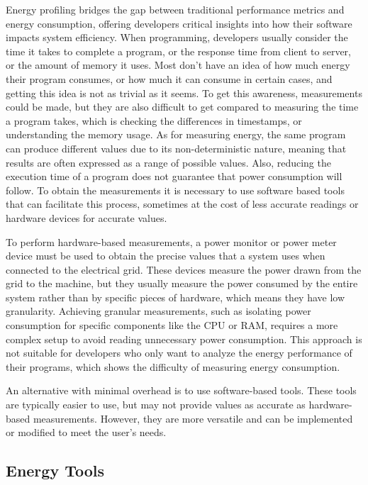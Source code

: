 \documentclass[sigplan]{acmart}
\begin{document}
Energy profiling bridges the gap between traditional performance metrics and energy consumption, offering developers critical insights into how their software impacts system efficiency.
When programming, developers usually consider the time it takes to complete a program, or the response time from client to server, or the amount of memory it uses. Most don't have an idea of how much energy their program consumes, or how much it can consume in certain cases, and getting this idea is not as trivial as it seems. To get this awareness, measurements could be made, but they are also difficult to get compared to measuring the time a program takes, which is checking the differences in timestamps, or understanding the memory usage. As for measuring energy, the same program can produce different values due to its non-deterministic nature, meaning that results are often expressed as a range of possible values. Also, reducing the execution time of a program does not guarantee that power consumption will follow\cite{10.1145/3136014.3136031}. To obtain the measurements it is necessary to use software based tools that can facilitate this process, sometimes at the cost of less accurate readings or hardware devices for accurate values.

To perform hardware-based measurements, a power monitor or power meter device\cite{hackenberg2013power,ge2009powerpack} must be used to obtain the precise values that a system uses when connected to the electrical grid. These devices measure the power drawn from the grid to the machine, but they usually measure the power consumed by the entire system rather than by specific pieces of hardware, which means they have low granularity. Achieving granular measurements, such as isolating power consumption for specific components like the CPU or RAM, requires a more complex setup to avoid reading unnecessary power consumption. This approach is not suitable for developers who only want to analyze the energy performance of their programs, which shows the difficulty of measuring energy consumption.

An alternative with minimal overhead is to use software-based tools. These tools are typically easier to use, but may not provide values as accurate as hardware-based measurements. However, they are more versatile and can be implemented or modified to meet the user's needs. 

\subsection{Energy Tools} \label{sec:background_energy}
\end{document}
